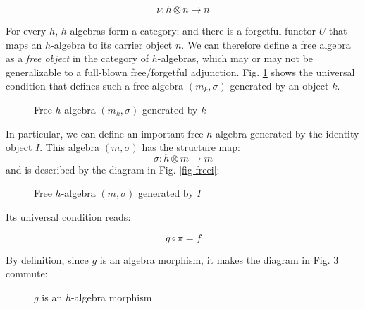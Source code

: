 \documentclass[letterpaper, 10 pt, conference]{ieeeconf}
\begin{document}
\[\nu \colon h \otimes n \to n\]

For every $h$, $h$-algebras form a category; and there is a forgetful functor $U$ that maps an $h$-algebra to its carrier object $n$. We can therefore define a free algebra as a \textit{free object} in the category of $h$-algebras, which may or may not be generalizable to a full-blown free/forgetful adjunction. Fig. \ref{fig-freea} shows the universal condition that defines such a free algebra $(m_k, \sigma)$ generated by an object $k$.

\begin{figure}[h]
\centering
{}
\caption{Free $h$-algebra $(m_k, \sigma)$ generated by $k$}
\label{fig-freea}
\end{figure}

In particular, we can define an important free $h$-algebra generated by the identity object $I$. This algebra $(m, \sigma)$ has the structure map: 
\[\sigma \colon h \otimes m \to m\]
and is described by the diagram in Fig. \ref{fig-freei}:

\begin{figure}[h]
\centering
{}
\caption{Free $h$-algebra $(m, \sigma)$ generated by $I$}
\label{fig-freeai}
\end{figure}

Its universal condition reads:

\[g \circ \pi = f \]

By definition, since $g$ is an algebra morphism, it makes the diagram in Fig. \ref{fig-algmor} commute:
\begin{figure}[h]
\centering
{}
\caption{$g$ is an $h$-algebra morphism}
\label{fig-algmor}
\end{figure}
\end{document}
